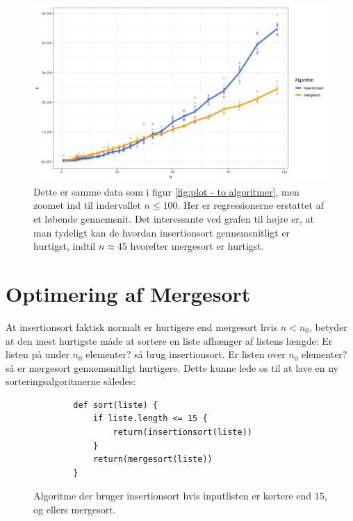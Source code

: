 \begin{figure}
	\begin{center}
		\includegraphics[scale=0.6]{../img/toAlgoritmerZoomedGns.png}
	\end{center}
	\caption{Dette er samme data som i figur \ref{fig:plot - to algoritmer}, men zoomet ind til indervallet $n \leq 100$. Her er regressionerne erstattet af et løbende gennemsnit. Det interessante ved grafen til højre er, at man tydeligt kan de hvordan insertionsort gennemsnitligt er hurtigst, indtil $n \approx 45$ hvorefter mergesort er hurtigst.}
	\label{fig:toAlgoritmerZoomedGns}
\end{figure}

\section{Optimering af Mergesort}%
\label{sub:Optimering af Mergesort}

At insertionsort faktisk normalt er hurtigere end mergesort hvis $n < n_0$, betyder at den mest hurtigste måde at sortere en liste afhænger af listens længde: Er listen på under $n_0$ elementer? så brug insertionsort. Er listen over $n_0$ elementer? så er mergesort gennemsnitligt hurtigere. Dette kunne lede os til at lave en ny sorteringsalgoritmerne således:

\begin{figure}[h]
	\begin{center}
		\begin{lstlisting}
		def sort(liste) {
			if liste.length <= 15 {
				return(insertionsort(liste))
			}
			return(mergesort(liste))
		}
		\end{lstlisting}
	\end{center}
	\vspace{-6mm}
	\caption{Algoritme der bruger insertionsort hvis inputlisten er kortere end $15$, og ellers mergesort.}
	\label{fig:hybridalgoritme1}
\end{figure}


